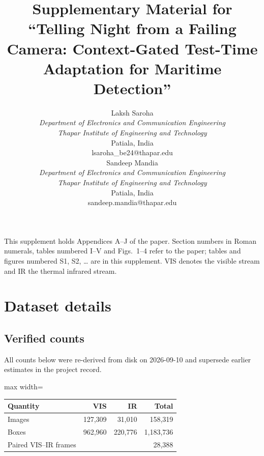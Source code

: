 \documentclass[journal,onecolumn]{IEEEtran}
\begin{document}
\title{Supplementary Material for\\``Telling Night from a Failing Camera: Context-Gated Test-Time Adaptation for Maritime Detection''}
\author{{\small\begin{tabular}[t]{@{}c@{}}
\normalsize Laksh Saroha\\
\textit{Department of Electronics and Communication Engineering}\\
\textit{Thapar Institute of Engineering and Technology}\\
Patiala, India\\
lsaroha\_be24@thapar.edu
\end{tabular}}
\hspace{2.5em}
{\small\begin{tabular}[t]{@{}c@{}}
\normalsize Sandeep Mandia\\
\textit{Department of Electronics and Communication Engineering}\\
\textit{Thapar Institute of Engineering and Technology}\\
Patiala, India\\
sandeep.mandia@thapar.edu
\end{tabular}}}
\maketitle

This supplement holds Appendices A--J of the paper. Section numbers in Roman numerals, tables numbered I--V and Figs.~1--4 refer to the paper; tables and figures numbered S1, S2, \ldots{} are in this supplement. VIS denotes the visible stream and IR the thermal infrared stream.

\FloatBarrier
\section{Dataset details}\label{app:A}
\subsection{Verified counts}\label{app:A.1}
All counts below were re-derived from disk on 2026-09-10 and supersede earlier estimates in the project record.

\begin{center}
\small
\begin{adjustbox}{max width=\linewidth}
\begin{tabular}{lrrr}
\toprule
Quantity & VIS & IR & Total \\
\midrule
Images & 127,309 & 31,010 & 158,319 \\
Boxes & 962,960 & 220,776 & 1,183,736 \\
Paired VIS--IR frames &  &  & 28,388 \\
\bottomrule
\end{tabular}
\end{adjustbox}
\end{center}
\end{document}

